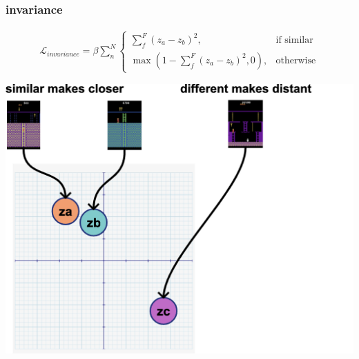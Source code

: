 \documentclass{beamer}
\begin{document}
\begin{frame}
  
  \frametitle{invariance}
 
  \begin{align*}
    \mathcal{L}_{invariance} = \beta  \sum_{n}^{N}  \begin{cases}
                                            \sum_{f}^{F} (z_a - z_b)^2,& \text{if similar}\\
                                            \max(1 - \sum_{f}^{F} (z_a - z_b)^2, 0), & \text{otherwise}
                                          \end{cases} 
  \end{align*}  

  \centering
  \includegraphics[scale=0.15]{../diagrams/cnd/invariance.png}


\end{frame}
\end{document}
